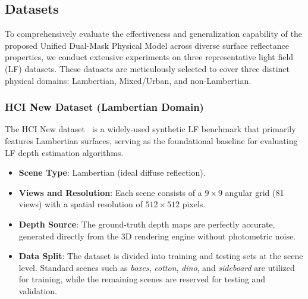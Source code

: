 \documentclass[lettersize,journal]{IEEEtran}
\begin{document}
\subsection{Datasets}

To comprehensively evaluate the effectiveness and generalization capability of the proposed Unified Dual-Mask Physical Model across diverse surface reflectance properties, we conduct extensive experiments on three representative light field (LF) datasets. These datasets are meticulously selected to cover three distinct physical domains: Lambertian, Mixed/Urban, and non-Lambertian. 

\subsubsection{HCI New Dataset (Lambertian Domain)}
The HCI New dataset~\cite{heber2018} is a widely-used synthetic LF benchmark that primarily features Lambertian surfaces, serving as the foundational baseline for evaluating LF depth estimation algorithms.
\begin{itemize}
\item \textbf{Scene Type}: Lambertian (ideal diffuse reflection).
\item \textbf{Views and Resolution}: Each scene consists of a $9 \times 9$ angular grid (81 views) with a spatial resolution of $512 \times 512$ pixels.
\item \textbf{Depth Source}: The ground-truth depth maps are perfectly accurate, generated directly from the 3D rendering engine without photometric noise.
\item \textbf{Data Split}: The dataset is divided into training and testing sets at the scene level. Standard scenes such as \textit{boxes}, \textit{cotton}, \textit{dino}, and \textit{sideboard} are utilized for training, while the remaining scenes are reserved for testing and validation.
\end{itemize}
\end{document}
